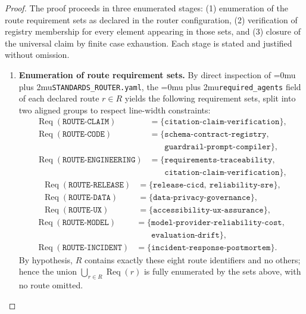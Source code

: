 \documentclass[12pt]{article}
\theoremstyle{definition}
\DeclareRobustCommand{\code}[1]{\begingroup\Urlmuskip=0mu plus 2mu\relax\nolinkurl{#1}\endgroup}
\begin{document}
\begin{proof}
The proof proceeds in three enumerated stages: (1) enumeration of the
route requirement sets as declared in the router configuration,
(2) verification of registry membership for every element appearing
in those sets, and (3) closure of the universal claim by finite case
exhaustion. Each stage is stated and justified without omission.

\begin{enumerate}
      \item \textbf{Enumeration of route requirement sets.}
      By direct inspection of \code{STANDARDS\_ROUTER.yaml}, the
      \code{required\_agents} field of each declared route $r \in R$
      yields the following requirement sets, split into two aligned
      groups to respect line-width constraints:
      \begin{align*}
            \operatorname{Req}(\texttt{ROUTE-CLAIM})
                  &= \{\texttt{citation-claim-verification}\}, \\
            \operatorname{Req}(\texttt{ROUTE-CODE})
                  &= \{\texttt{schema-contract-registry},\ \\
                  &\phantom{{}=\{{}}\texttt{guardrail-prompt-compiler}\}, \\
            \operatorname{Req}(\texttt{ROUTE-ENGINEERING})
                  &= \{\texttt{requirements-traceability},\ \\
                  &\phantom{{}=\{{}}\texttt{citation-claim-verification}\},
      \end{align*}
      \begin{align*}
            \operatorname{Req}(\texttt{ROUTE-RELEASE})
                  &= \{\texttt{release-cicd},\ \texttt{reliability-sre}\}, \\
            \operatorname{Req}(\texttt{ROUTE-DATA})
                  &= \{\texttt{data-privacy-governance}\}, \\
            \operatorname{Req}(\texttt{ROUTE-UX})
                  &= \{\texttt{accessibility-ux-assurance}\},
      \end{align*}
      \begin{align*}
            \operatorname{Req}(\texttt{ROUTE-MODEL})
                  &= \{\texttt{model-provider-reliability-cost},\ \\
                  &\phantom{{}=\{{}}\texttt{evaluation-drift}\}, \\
            \operatorname{Req}(\texttt{ROUTE-INCIDENT})
                  &= \{\texttt{incident-response-postmortem}\}.
      \end{align*}
      By hypothesis, $R$ contains exactly these eight route
      identifiers and no others; hence the union
      $\bigcup_{r \in R} \operatorname{Req}(r)$ is fully enumerated
      by the sets above, with no route omitted.


\end{enumerate}
\end{proof}
\end{document}
